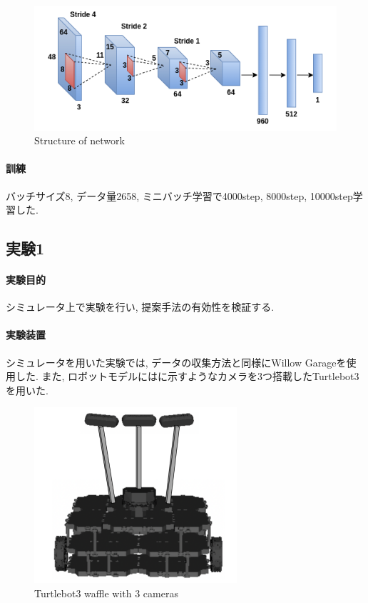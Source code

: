 \vspace{5mm}
\begin{figure}[h]
  \centering
  \includegraphics[keepaspectratio, scale=0.42]{images/cnn.png}
  \caption{Structure of network}
  \label{Fig:cnn}
  \end{figure}

\paragraph{訓練}
バッチサイズ8, データ量2658, ミニバッチ学習で4000step, 8000step, 10000step学習した.

\subsection{実験1}
\paragraph{実験目的}
シミュレータ上で実験を行い, 提案手法の有効性を検証する.

\paragraph{実験装置}
シミュレータを用いた実験では, データの収集方法と同様にWillow Garageを使用した. また, ロボットモデルにはに示すようなカメラを3つ搭載したTurtlebot3を用いた. 

\begin{figure}[h]
  \centering
  \includegraphics[keepaspectratio, scale=0.42]{images/turtlebot3.png}
  \caption{Turtlebot3 waffle with 3 cameras}
  \label{Fig:turtlebot3}
  \end{figure}

